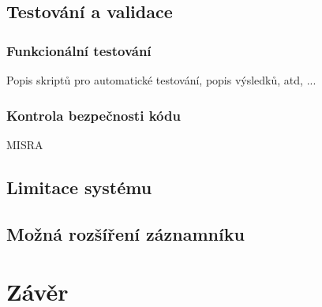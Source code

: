 
\section{Testování a validace}

\subsection{Funkcionální testování}
Popis skriptů pro automatické testování, popis výsledků, atd, ...

\subsection{Kontrola bezpečnosti kódu}
MISRA


\section{Limitace systému}
\label{limitace}


\section{Možná rozšíření záznamníku}
\label{mozne_rozsireni}

\chapter{Závěr}
\label{zaverPrace}



%
